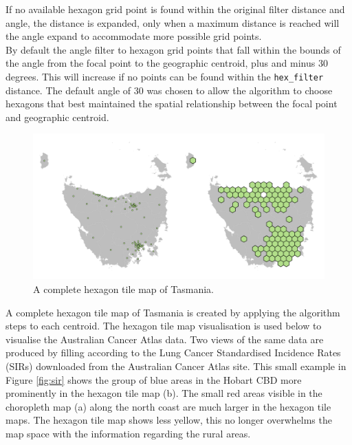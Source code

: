 \documentclass{monashthesis}
\begin{document}
If no available hexagon grid point is found within the original filter distance and angle, the distance is expanded, only when a maximum distance is reached will the angle expand to accommodate more possible grid points.\\
By default the angle filter to hexagon grid points that fall within the bounds of the angle from the focal point to the geographic centroid, plus and minus 30 degrees. This will increase if no points can be found within the \texttt{hex\_filter} distance. The default angle of 30 was chosen to allow the algorithm to choose hexagons that best maintained the spatial relationship between the focal point and geographic centroid.

\begin{figure}[H]
\centering
\includegraphics[width=16cm]{figures/03-algorithm/6allocate.png}
\caption{\label{fig:buffs}A complete hexagon tile map of Tasmania.}
\end{figure}

A complete hexagon tile map of Tasmania is created by applying the algorithm steps to each centroid.
The hexagon tile map visualisation is used below to visualise the Australian Cancer Atlas data. Two views of the same data are produced by filling according to the Lung Cancer Standardised Incidence Rates (SIRs) downloaded from the Australian Cancer Atlas site. This small example in Figure \ref{fig:sir} shows the group of blue areas in the Hobart CBD more prominently in the hexagon tile map (b).
The small red areas visible in the choropleth map (a) along the north coast are much larger in the hexagon tile maps. The hexagon tile map shows less yellow, this no longer overwhelms the map space with the information regarding the rural areas.
\end{document}
